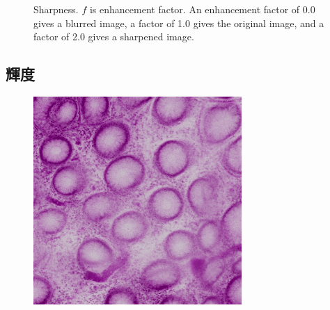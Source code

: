 \begin{figure}[H]
	\caption{Sharpness. $f$ is enhancement factor. An enhancement factor of 0.0 gives a blurred image, a factor of 1.0 gives the original image, and a factor of 2.0 gives a sharpened image.}
	\label{fig:シャープネス}
	
\end{figure}

\subsection*{輝度}
\begin{figure}[H]
	\centering
	
	\begin{minipage}{0.25\columnwidth}
		\centering
		\includegraphics[clip, width=\linewidth]{fig/preprocessing/data_aug/color/BRIGHTNESS/BRIGHTNESS_0_80}
	\end{minipage}
	\begin{minipage}{0.25\columnwidth}
		\centering

\end{minipage}
\end{figure}
